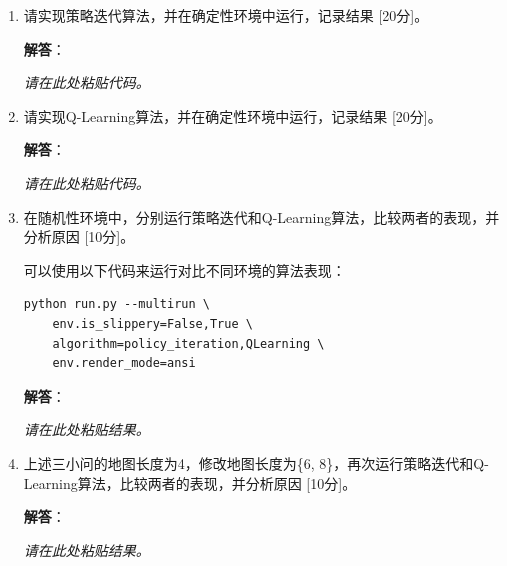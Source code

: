 \documentclass[a4paper,12pt]{article}
\begin{document}
\begin{enumerate}[label=(\roman*)]
\item 请实现策略迭代算法，并在确定性环境中运行，记录结果 [20分]。

\textbf{解答}：

    \emph{请在此处粘贴代码。}
    \vspace{2cm}

\item 请实现Q-Learning算法，并在确定性环境中运行，记录结果 [20分]。

\textbf{解答}：

    \emph{请在此处粘贴代码。}
    \vspace{2cm}


\item 在随机性环境中，分别运行策略迭代和Q-Learning算法，比较两者的表现，并分析原因 [10分]。

可以使用以下代码来运行对比不同环境的算法表现：

\begin{verbatim}
python run.py --multirun \
    env.is_slippery=False,True \
    algorithm=policy_iteration,QLearning \
    env.render_mode=ansi
\end{verbatim}

\textbf{解答}：


    \emph{请在此处粘贴结果。}
    \vspace{1cm}


\item 上述三小问的地图长度为4，修改地图长度为\{6, 8\}，再次运行策略迭代和Q-Learning算法，比较两者的表现，并分析原因 [10分]。

\textbf{解答}：


    \emph{请在此处粘贴结果。}
    \vspace{1cm}

\end{enumerate}
\end{document}
